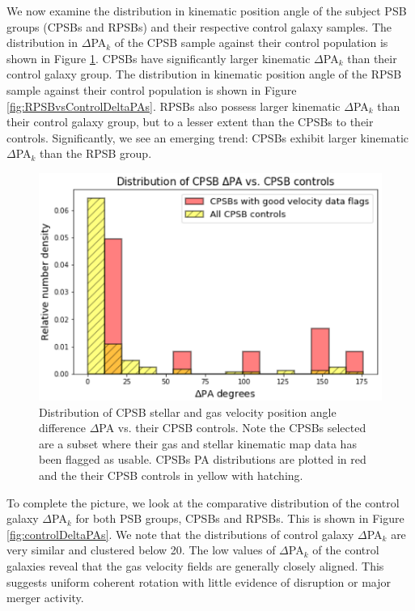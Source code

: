 We now examine the distribution in kinematic position angle of the subject PSB groups (CPSBs and RPSBs) and their respective control galaxy samples. The distribution in $\Delta$PA$_{k}$ of the CPSB sample against their control population is shown in Figure \ref{fig:CPSBvsControlDeltaPAs}. CPSBs have significantly larger kinematic $\Delta$PA$_{k}$ than their control galaxy group. The distribution in kinematic position angle of the RPSB sample against their control population is shown in Figure \ref{fig:RPSBvsControlDeltaPAs}. RPSBs also possess larger kinematic $\Delta$PA$_{k}$ than their control galaxy group, but to a lesser extent than the CPSBs to their controls. Significantly, we see an emerging trend: CPSBs exhibit larger kinematic $\Delta$PA$_{k}$ than the RPSB group.

\begin{figure}
    \centering
    \includegraphics[width=\columnwidth]{images/JupyterPlots/DIST-DPA-CPSB+FLAGS+controls.png}
    \caption[Distribution of CPSB $\Delta$PA vs. their CPSB controls]{Distribution of CPSB stellar and gas velocity position angle difference $\Delta$PA vs. their CPSB controls. Note the CPSBs selected are a subset where their gas and stellar kinematic map data has been flagged as usable. CPSBs PA distributions are plotted in red and the their CPSB controls in yellow with hatching.}
    \label{fig:CPSBvsControlDeltaPAs}
\end{figure}

To complete the picture, we look at the comparative distribution of the control galaxy $\Delta$PA$_{k}$ for both PSB groups, CPSBs and RPSBs. This is shown in Figure \ref{fig:controlDeltaPAs}. We note that the distributions of control galaxy $\Delta$PA$_{k}$ are very similar and clustered below 20\textdegree. The low values of $\Delta$PA$_{k}$ of the control galaxies reveal that the gas velocity fields  are generally closely aligned. This suggests uniform coherent rotation with little evidence of disruption or major merger activity.

